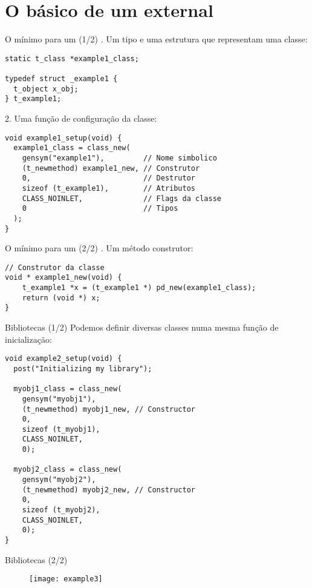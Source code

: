 \section{O básico de um external}


\begin{frame}[fragile]{O mínimo para um \external (1/2)}
. Um tipo e uma estrutura que representam uma classe: 
\begin{lstlisting}
static t_class *example1_class;

typedef struct _example1 {
  t_object x_obj;
} t_example1;
\end{lstlisting}
2. Uma função de configuração da classe:
\begin{lstlisting}[firstnumber=last]
void example1_setup(void) {
  example1_class = class_new(
    gensym("example1"),         // Nome simbolico
    (t_newmethod) example1_new, // Construtor
    0,                          // Destrutor
    sizeof (t_example1),        // Atributos
    CLASS_NOINLET,              // Flags da classe
    0                           // Tipos
  );
}
\end{lstlisting}
\end{frame}


\begin{frame}[fragile]{O mínimo para um \external (2/2)}
. Um método construtor:
\begin{lstlisting}[firstnumber=last]
// Construtor da classe
void * example1_new(void) {
    t_example1 *x = (t_example1 *) pd_new(example1_class);
    return (void *) x;
}
\end{lstlisting}
\end{frame}


\begin{frame}[fragile]{Bibliotecas (1/2)}
Podemos definir diversas classes numa mesma função de inicialização:
\begin{lstlisting}
void example2_setup(void) {
  post("Initializing my library");

  myobj1_class = class_new(
    gensym("myobj1"),
    (t_newmethod) myobj1_new, // Constructor
    0,
    sizeof (t_myobj1),
    CLASS_NOINLET,
    0);

  myobj2_class = class_new(
    gensym("myobj2"),
    (t_newmethod) myobj2_new, // Constructor
    0,
    sizeof (t_myobj2),
    CLASS_NOINLET,
    0);
}
\end{lstlisting}
\end{frame}


\begin{frame}[fragile]{Bibliotecas (2/2)}
\begin{figure}
\centering
\texttt{[image: example3]}
\end{figure}
\end{frame}


